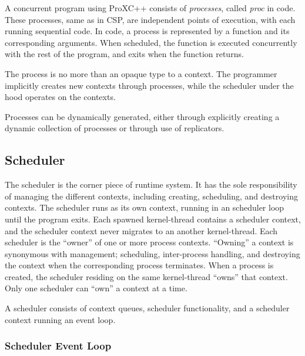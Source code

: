 A concurrent program using ProXC++ consists of \textit{processes}, called \textit{proc} in code. These processes, same as in CSP, are independent points of execution, with each running sequential code. In code, a process is represented by a function and its corresponding arguments. When scheduled, the function is executed concurrently with the rest of the program, and exits when the function returns. 

The process is no more than an opaque type to a context. The programmer implicitly creates new contexts through processes, while the scheduler under the hood operates on the contexts.

Processes can be dynamically generated, either through explicitly creating a dynamic collection of processes or through use of replicators.



\FloatBarrier
\subsection{Scheduler}
\label{subsec:scheduler}

The scheduler is the corner piece of runtime system. It has the sole responsibility of managing the different contexts, including creating, scheduling, and destroying contexts. The scheduler runs as its own context, running in an scheduler loop until the program exits. Each spawned kernel\hyp{}thread contains a scheduler context, and the scheduler context never migrates to an another kernel\hyp{}thread. Each scheduler is the ``owner'' of one or more process contexts. ``Owning'' a context is synonymous with management; scheduling, inter\hyp{}process handling, and destroying the context when the corresponding process terminates. When a process is created, the scheduler residing on the same kernel\hyp{}thread ``owns'' that context. Only one scheduler can ``own'' a context at a time.

A scheduler consists of context queues, scheduler functionality, and a scheduler context running an event loop.


\FloatBarrier
\subsubsection{Scheduler Event Loop}

